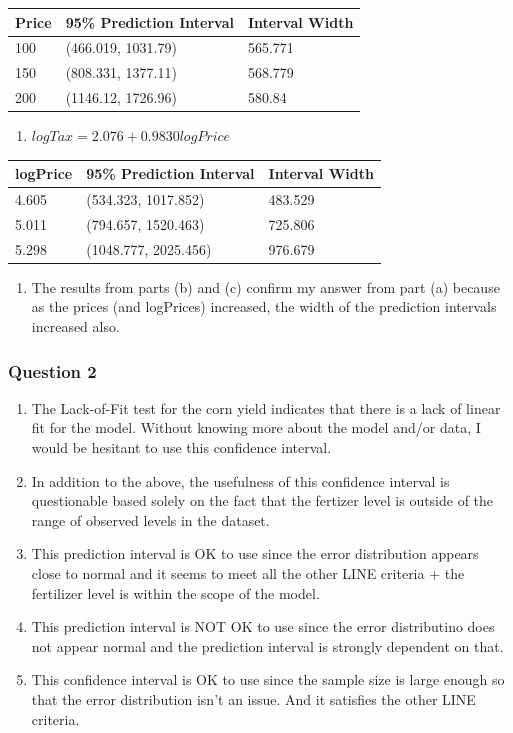 \documentclass{article}
\providecommand{\tightlist}{%
      \setlength{\itemsep}{0pt}\setlength{\parskip}{0pt}}
\begin{document}
\begin{longtable}[c]{@{}lll@{}}
\toprule
Price & 95\% Prediction Interval & Interval Width\tabularnewline
\midrule
\endhead
100 & (466.019, 1031.79) & 565.771\tabularnewline
150 & (808.331, 1377.11) & 568.779\tabularnewline
200 & (1146.12, 1726.96) & 580.84\tabularnewline
\bottomrule
\end{longtable}

\begin{enumerate}
\def\labelenumi{\alph{enumi}.}
\setcounter{enumi}{2}
\tightlist
\item
  \(logTax = 2.076 + 0.9830 logPrice\)
\end{enumerate}

\begin{longtable}[c]{@{}lll@{}}
\toprule
logPrice & 95\% Prediction Interval & Interval Width\tabularnewline
\midrule
\endhead
4.605 & (534.323, 1017.852) & 483.529\tabularnewline
5.011 & (794.657, 1520.463) & 725.806\tabularnewline
5.298 & (1048.777, 2025.456) & 976.679\tabularnewline
\bottomrule
\end{longtable}

\begin{enumerate}
\def\labelenumi{\alph{enumi}.}
\setcounter{enumi}{3}
\tightlist
\item
  The results from parts (b) and (c) confirm my answer from part (a)
  because as the prices (and logPrices) increased, the width of the
  prediction intervals increased also.
\end{enumerate}

    \subsubsection{Question 2}\label{question-2}

\begin{enumerate}
\def\labelenumi{\alph{enumi}.}
\item
  The Lack-of-Fit test for the corn yield indicates that there is a lack
  of linear fit for the model. Without knowing more about the model
  and/or data, I would be hesitant to use this confidence interval.
\item
  In addition to the above, the usefulness of this confidence interval
  is questionable based solely on the fact that the fertizer level is
  outside of the range of observed levels in the dataset.
\item
  This prediction interval is OK to use since the error distribution
  appears close to normal and it seems to meet all the other LINE
  criteria + the fertilizer level is within the scope of the model.
\item
  This prediction interval is NOT OK to use since the error distributino
  does not appear normal and the prediction interval is strongly
  dependent on that.
\item
  This confidence interval is OK to use since the sample size is large
  enough so that the error distribution isn't an issue. And it satisfies
  the other LINE criteria.
\end{enumerate}
\end{document}
